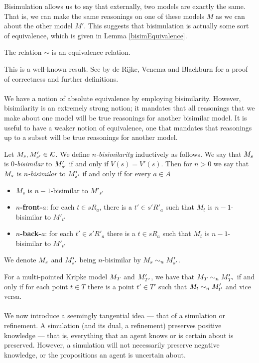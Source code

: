 Bisimulation allows us to say that externally, two models are exactly the same.
That is, we can make the same reasonings on one of these models $M$ as we can about the other model
$M'$.
This suggests that bisimulation is actually some sort of equivalence, which is given in Lemma
\ref{bisimEquivalence}.

\begin{lemma} \label{bisimEquivalence}
	The relation $\sim$ is an equivalence relation.
\end{lemma}

This is a well-known result.
See \cite{blackburn2002modal} by de Rijke, Venema and Blackburn for a proof of correctness and
further definitions.\\
\\
We have a notion of absolute equivalence by employing bisimilarity.
However, bisimilarity is an extremely strong notion; it mandates that all reasonings that we make
about one model will be true reasonings for another bisimilar model.
It is useful to have a weaker notion of equivalence, one that mandates that reasonings up to a
subset will be true reasonings for another model.

\begin{defn} \label{nBisimKripke}
Let $M_s, M'_{s'} \in \mathcal{K}$.
We define {\em $n$-bisimilarity} inductively as follows.
We say that $M_s$ is {\em $0$-bisimilar} to $M'_{s'}$ if and only if $V(s) = V'(s)$.
Then for $n > 0$ we say that $M_s$ is {\em $n$-bisimilar} to $M'_{s'}$ if and only if for every $a \in A$
\begin{itemize}
	\item $M_s$ is $n-1$-bisimilar to $M'_{s'}$
	\item {\bf $n$-front-$a$}: for each $t \in s R_a$, there is a $t' \in s' R'_a$ such that $M_t$ is
	$n-1$-bisimilar to $M'_{t'}$
	\item {\bf $n$-back-$a$}: for each $t' \in s' R'_a$ there is a $t \in s R_a$ such that $M_t$ is
	$n-1$-bisimilar to $M'_{t'}$
\end{itemize}
We denote $M_s$ and $M'_{s'}$ being $n$-bisimilar by $M_s \sim_n
M'_{s'}$.
\end{defn}

For a multi-pointed Kripke model $M_T$ and $M'_{T'}$, we have that
$M_T \sim_n
M'_{T'}$ if and only if for each point $t \in T$ there is a point $t' \in T'$
such that $M_t \sim_n M'_{t'}$ and vice versa.\\
\\
We now introduce a seemingly tangential idea --- that of a simulation or refinement.
A simulation (and its dual, a refinement) preserves positive knowledge --- that is, everything that an agent knows or is certain
about is preserved.
However, a simulation will not necessarily preserve negative knowledge, or the propositions an agent
is uncertain about.

